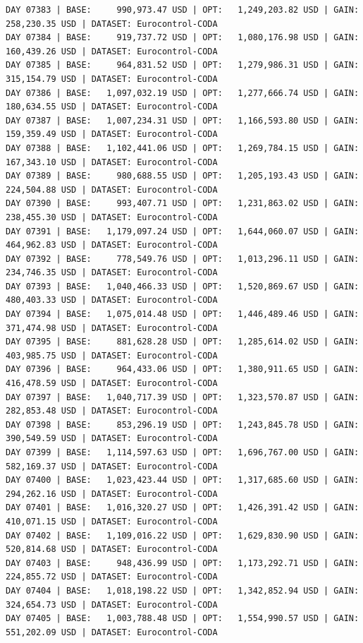 \documentclass[11pt,a4paper]{article}
\begin{document}
\begin{verbatim}
DAY 07383 | BASE:     990,973.47 USD | OPT:   1,249,203.82 USD | GAIN: 258,230.35 USD | DATASET: Eurocontrol-CODA
DAY 07384 | BASE:     919,737.72 USD | OPT:   1,080,176.98 USD | GAIN: 160,439.26 USD | DATASET: Eurocontrol-CODA
DAY 07385 | BASE:     964,831.52 USD | OPT:   1,279,986.31 USD | GAIN: 315,154.79 USD | DATASET: Eurocontrol-CODA
DAY 07386 | BASE:   1,097,032.19 USD | OPT:   1,277,666.74 USD | GAIN: 180,634.55 USD | DATASET: Eurocontrol-CODA
DAY 07387 | BASE:   1,007,234.31 USD | OPT:   1,166,593.80 USD | GAIN: 159,359.49 USD | DATASET: Eurocontrol-CODA
DAY 07388 | BASE:   1,102,441.06 USD | OPT:   1,269,784.15 USD | GAIN: 167,343.10 USD | DATASET: Eurocontrol-CODA
DAY 07389 | BASE:     980,688.55 USD | OPT:   1,205,193.43 USD | GAIN: 224,504.88 USD | DATASET: Eurocontrol-CODA
DAY 07390 | BASE:     993,407.71 USD | OPT:   1,231,863.02 USD | GAIN: 238,455.30 USD | DATASET: Eurocontrol-CODA
DAY 07391 | BASE:   1,179,097.24 USD | OPT:   1,644,060.07 USD | GAIN: 464,962.83 USD | DATASET: Eurocontrol-CODA
DAY 07392 | BASE:     778,549.76 USD | OPT:   1,013,296.11 USD | GAIN: 234,746.35 USD | DATASET: Eurocontrol-CODA
DAY 07393 | BASE:   1,040,466.33 USD | OPT:   1,520,869.67 USD | GAIN: 480,403.33 USD | DATASET: Eurocontrol-CODA
DAY 07394 | BASE:   1,075,014.48 USD | OPT:   1,446,489.46 USD | GAIN: 371,474.98 USD | DATASET: Eurocontrol-CODA
DAY 07395 | BASE:     881,628.28 USD | OPT:   1,285,614.02 USD | GAIN: 403,985.75 USD | DATASET: Eurocontrol-CODA
DAY 07396 | BASE:     964,433.06 USD | OPT:   1,380,911.65 USD | GAIN: 416,478.59 USD | DATASET: Eurocontrol-CODA
DAY 07397 | BASE:   1,040,717.39 USD | OPT:   1,323,570.87 USD | GAIN: 282,853.48 USD | DATASET: Eurocontrol-CODA
DAY 07398 | BASE:     853,296.19 USD | OPT:   1,243,845.78 USD | GAIN: 390,549.59 USD | DATASET: Eurocontrol-CODA
DAY 07399 | BASE:   1,114,597.63 USD | OPT:   1,696,767.00 USD | GAIN: 582,169.37 USD | DATASET: Eurocontrol-CODA
DAY 07400 | BASE:   1,023,423.44 USD | OPT:   1,317,685.60 USD | GAIN: 294,262.16 USD | DATASET: Eurocontrol-CODA
DAY 07401 | BASE:   1,016,320.27 USD | OPT:   1,426,391.42 USD | GAIN: 410,071.15 USD | DATASET: Eurocontrol-CODA
DAY 07402 | BASE:   1,109,016.22 USD | OPT:   1,629,830.90 USD | GAIN: 520,814.68 USD | DATASET: Eurocontrol-CODA
DAY 07403 | BASE:     948,436.99 USD | OPT:   1,173,292.71 USD | GAIN: 224,855.72 USD | DATASET: Eurocontrol-CODA
DAY 07404 | BASE:   1,018,198.22 USD | OPT:   1,342,852.94 USD | GAIN: 324,654.73 USD | DATASET: Eurocontrol-CODA
DAY 07405 | BASE:   1,003,788.48 USD | OPT:   1,554,990.57 USD | GAIN: 551,202.09 USD | DATASET: Eurocontrol-CODA

\end{verbatim}
\end{document}
